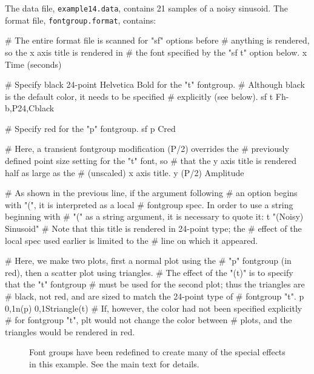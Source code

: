 \documentclass{book}
\begin{document}
The data file, {\tt example14.data}, contains 21 samples of a noisy sinusoid.
The format file, {\tt fontgroup.format}, contains:
\begin{center}
\begin{boxedverbatim}
# The entire format file is scanned for "sf" options before
# anything is rendered, so the x axis title is rendered in
# the font specified by the "sf t" option below.
x Time (seconds)

# Specify black 24-point Helvetica Bold for the "t" fontgroup.
# Although black is the default color, it needs to be specified
# explicitly (see below).
sf t Fh-b,P24,Cblack

# Specify red for the "p" fontgroup.
sf p Cred

# Here, a transient fontgroup modification (P/2) overrides the
# previously defined point size setting for the "t" font, so
# that the y axis title is rendered half as large as the
# (unscaled) x axis title.
y (P/2) Amplitude

# As shown in the previous line, if the argument following
# an option begins with "(", it is interpreted as a local
# fontgroup spec.  In order to use a string beginning with
# "(" as a string argument, it is necessary to quote it:
t "(Noisy) Sinusoid"
# Note that this title is rendered in 24-point type;  the
# effect of the local spec used earlier is limited to the
# line on which it appeared.

# Here, we make two plots, first a normal plot using the
# "p" fontgroup (in red), then a scatter plot using triangles.
# The effect of the "(t)" is to specify that the "t" fontgroup
# must be used for the second plot;  thus the triangles are
# black, not red, and are sized to match the 24-point type of
# fontgroup "t".
p 0,1n(p) 0,1Striangle(t)
# If, however, the color had not been specified explicitly
# for fontgroup "t", plt would not change the color between
# plots, and the triangles would be rendered in red.
\end{boxedverbatim}
\end{center}

\begin{figure}
\begin{center}
\end{center}
\caption[Creating special effects using font groups]{Font groups have been
redefined to create many of the special effects in this example. See the main
text for details. \label{fig:example14}}
\end{figure}
\end{document}
